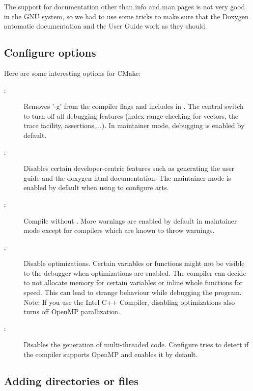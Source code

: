 The support for documentation other than info and man pages is not
very good in the GNU system, so we had to use some tricks to make sure
that the Doxygen automatic documentation and the User Guide work as they
should. 

\subsection{Configure options}

Here are some interesting options for CMake:

\begin{description}
\item[:] Removes '-g' from the compiler flags and includes  in
.  The central switch to turn off all debugging
features (index range checking for vectors, the trace facility,
assertions,...). In maintainer mode, debugging is enabled by default.

\item[:] 
Disables certain developer-centric features such as generating the user guide and the doxygen html documentation. The maintainer mode is enabled by default when using  to configure arts.

\item[:] 
Compile without . More warnings are enabled by default in maintainer mode except for compilers which are known to throw warnings.

\item[:]
Disable optimizations. Certain variables or functions might not be visible to the debugger when optimizations are enabled. The compiler can decide to not allocate memory for certain variables or inline whole functions for speed. This can lead to strange behaviour while debugging the program. Note: If you use the Intel C++ Compiler, disabling optimizations also turns off OpenMP parallization.

\item[:] 
Disables the generation of multi-threaded code. Configure tries to detect if the compiler supports OpenMP and enables it by default.

\end{description}


\subsection{Adding directories or files}

